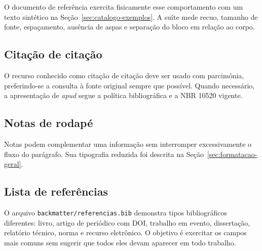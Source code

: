 O documento de referência exercita fisicamente esse comportamento com um texto sintético na Seção~\ref{sec:catalogo-exemplos}. A suíte mede recuo, tamanho de fonte, espaçamento, ausência de aspas e separação do bloco em relação ao corpo.

\subsection{Citação de citação}

O recurso conhecido como citação de citação deve ser usado com parcimônia, preferindo-se a consulta à fonte original sempre que possível. Quando necessário, a apresentação de \textit{apud} segue a política bibliográfica e a NBR 10520 vigente.


\subsection{Notas de rodapé}

Notas podem complementar uma informação sem interromper excessivamente o fluxo do parágrafo. Sua tipografia reduzida foi descrita na Seção~\ref{sec:formatacao-geral}.


\subsection{Lista de referências}


O arquivo \texttt{backmatter/referencias.bib} demonstra tipos bibliográficos diferentes: livro, artigo de periódico com DOI, trabalho em evento, dissertação, relatório técnico, norma e recurso eletrônico. O objetivo é exercitar os campos mais comuns sem sugerir que todos eles devam aparecer em todo trabalho.

